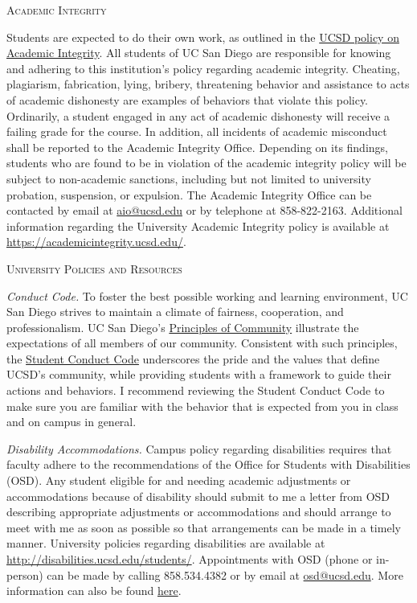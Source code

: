 \documentclass[11pt]{article}
\begin{document}
\bigskip
\normalsize

\noindent\textsc{Academic Integrity}

\noindent Students are expected to do their own work, as outlined in the \href{http://ucsd.edu/catalog/front/AcadInt.html}{UCSD policy on Academic Integrity}. All students of UC San Diego are responsible for knowing and adhering to this institution's policy regarding academic integrity. Cheating, plagiarism, fabrication, lying,
bribery, threatening behavior and assistance to acts of academic dishonesty are examples of
behaviors that violate this policy. Ordinarily, a student engaged in any act of academic dishonesty
will receive a failing grade for the course. In addition, all incidents of academic misconduct
shall be reported to the Academic Integrity Office. Depending on its findings, students who are found
to be in violation of the academic integrity policy will be subject to non-academic sanctions,
including but not limited to university probation, suspension, or expulsion. The Academic Integrity Office can be contacted by email at \href{mailto:aio@ucsd.edu}{aio@ucsd.edu} or by telephone at 858-822-2163. Additional information regarding the University Academic Integrity policy is available at \href{https://academicintegrity.ucsd.edu/}{https://academicintegrity.ucsd.edu/}.

\bigskip
\noindent\textsc{University Policies and Resources}

\noindent \textit{Conduct Code.} To foster the best possible working and learning environment, UC San Diego strives to maintain a climate of fairness, cooperation, and professionalism. UC San Diego's \href{https://ucsd.edu/about/principles.html}{Principles of Community} illustrate the expectations of all members of our community. Consistent with such principles, the \href{https://students.ucsd.edu/_files/student-conduct/ucsandiego-student-conduct-code_interim-revisions1-16-18.pdf}{Student Conduct Code} underscores the pride and the values that define UCSD's community,
while providing students with a framework to guide their actions and behaviors. I recommend reviewing the Student Conduct Code to make sure you are familiar with the behavior that is expected from you in class and on campus in general.

\noindent \textit{Disability Accommodations.} Campus policy regarding disabilities
requires that faculty adhere to the recommendations of the Office for Students with Disabilities (OSD). Any student eligible for and
needing academic adjustments or accommodations because of disability should submit to me a letter from OSD describing appropriate adjustments or accommodations and should arrange to meet with me as soon as possible so that arrangements can be made in a timely manner. University policies regarding disabilities are available at
\href{http://disabilities.ucsd.edu/students/}{http://disabilities.ucsd.edu/students/}. Appointments with OSD (phone or in-person) can be made by calling 858.534.4382 or by email at \href{mailto:osd@ucsd.edu}{osd@ucsd.edu}. More information can also be found \href{https://economics.ucsd.edu/undergraduate-program/accommodations-for-students-with-disabilities.html#Step-1:-Request-Academic-Accomm}{here}.
\end{document}

